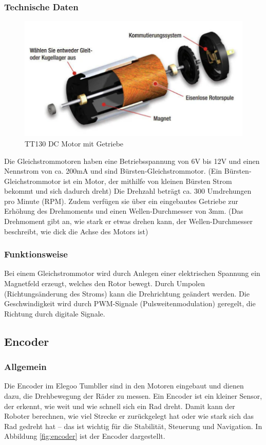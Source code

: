 \subsubsection{Technische Daten}
\begin{figure}[H]
    \centering
    \includegraphics[width=1\textwidth]{img/Hardware/gleichstrommotor.png}
    \caption{TT130 DC Motor mit Getriebe}
    \label{fig:gleichstrommotor}
\end{figure}
Die Gleichstrommotoren haben eine Betriebsspannung von 6V bis 12V und einen Nennstrom von ca. 200mA und sind Bürsten-Gleichstrommotor.
%
(Ein Bürsten-Gleichstrommotor ist ein Motor, der mithilfe von kleinen Bürsten Strom bekommt und sich dadurch dreht)
Die Drehzahl beträgt ca. 300 Umdrehungen pro Minute (RPM).
%
Zudem verfügen sie über ein eingebautes Getriebe zur Erhöhung des Drehmoments und einen Wellen-Durchmesser von 3mm.
%
(Das Drehmoment gibt an,
wie stark er etwas drehen kann,
der Wellen-Durchmesser beschreibt,
wie dick die Achse des Motors ist)
\subsubsection{Funktionsweise}
Bei einem Gleichstrommotor wird durch Anlegen einer elektrischen Spannung ein Magnetfeld erzeugt,
welches den Rotor bewegt.
%
Durch Umpolen (Richtungsänderung des Stroms) kann die Drehrichtung geändert werden.
%
Die Geschwindigkeit wird durch PWM-Signale (Pulsweitenmodulation) geregelt,
die Richtung durch digitale Signale. %
%
\subsection{Encoder}
\subsubsection{Allgemein}
Die Encoder im Elegoo Tumbller sind in den Motoren eingebaut und dienen dazu,
die Drehbewegung der Räder zu messen.
%
Ein Encoder ist ein kleiner Sensor, der erkennt, wie weit und wie schnell sich ein Rad dreht.
%
Damit kann der Roboter berechnen,
wie viel Strecke er zurückgelegt hat oder wie stark sich das Rad gedreht hat --
das ist wichtig für die Stabilität, Steuerung und Navigation.
%
In Abbildung \ref{fig:encoder} ist der Encoder dargestellt.

